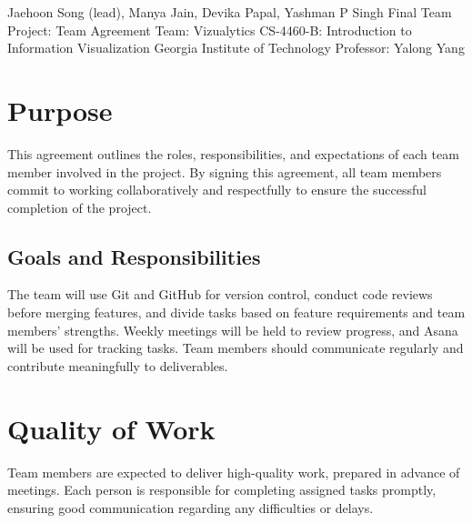 \documentclass[12pt]{article}
\begin{document}
\convertarraytostring
{\titleauthors}                                         %
{Jaehoon Song (lead), Manya Jain, Devika Papal, Yashman P Singh}
\customtitle
{Final Team Project: Team Agreement}                    %
{Team: Vizualytics}                                     %
{\titleauthors}
{CS-4460-B: Introduction to Information Visualization}  %
{Georgia Institute of Technology}                       %
{Professor: Yalong Yang}                                %



\section{Purpose}
This agreement outlines the roles, responsibilities, and expectations of each team member involved in the project. By signing this agreement, all team members commit to working collaboratively and respectfully to ensure the successful completion of the project.

\subsection{Goals and Responsibilities}
The team will use Git and GitHub for version control, conduct code reviews before merging features, and divide tasks based on feature requirements and team members’ strengths. Weekly meetings will be held to review progress, and Asana will be used for tracking tasks. Team members should communicate regularly and contribute meaningfully to deliverables.

\section{Quality of Work}
Team members are expected to deliver high-quality work, prepared in advance of meetings. Each person is responsible for completing assigned tasks promptly, ensuring good communication regarding any difficulties or delays.
\end{document}
